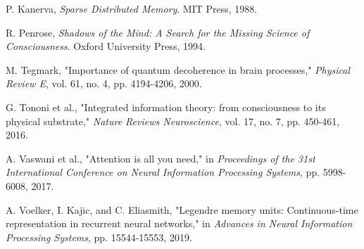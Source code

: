 \documentclass[11pt,letterpaper]{article}
\begin{document}
\begin{thebibliography}{00}
 P. Kanerva, \textit{Sparse Distributed Memory}. MIT Press, 1988.

 R. Penrose, \textit{Shadows of the Mind: A Search for the Missing Science of Consciousness}. Oxford University Press, 1994.

 M. Tegmark, "Importance of quantum decoherence in brain processes," \textit{Physical Review E}, vol. 61, no. 4, pp. 4194-4206, 2000.

 G. Tononi et al., "Integrated information theory: from consciousness to its physical substrate," \textit{Nature Reviews Neuroscience}, vol. 17, no. 7, pp. 450-461, 2016.

 A. Vaswani et al., "Attention is all you need," in \textit{Proceedings of the 31st International Conference on Neural Information Processing Systems}, pp. 5998-6008, 2017.

 A. Voelker, I. Kajic, and C. Eliasmith, "Legendre memory units: Continuous-time representation in recurrent neural networks," in \textit{Advances in Neural Information Processing Systems}, pp. 15544-15553, 2019.

\end{thebibliography}
\end{document}

